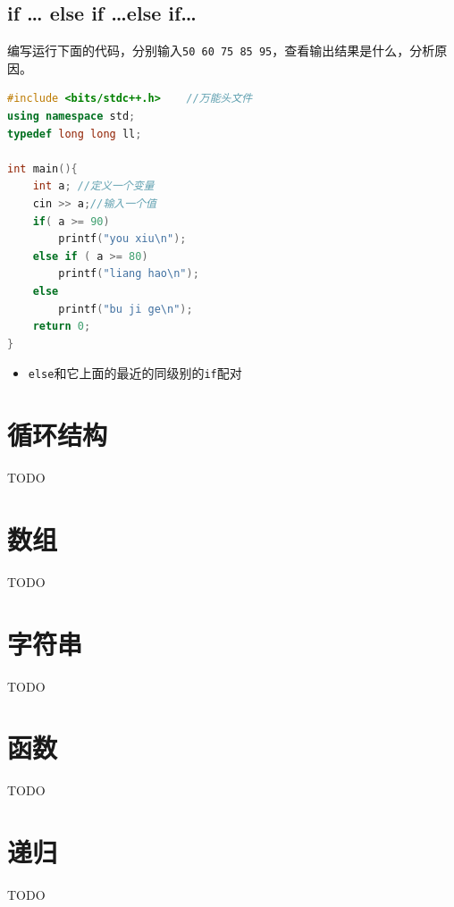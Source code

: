 \documentclass[
  paper=a4,
  ,captions=tableheading
]{scrbook}
\newcommand{\passthrough}[1]{#1}
\providecommand{\tightlist}{%
  \setlength{\itemsep}{0pt}\setlength{\parskip}{0pt}}
\begin{document}
\hypertarget{if-else-if-else-if}{%
\subsection{if \ldots{} else if \ldots else
if\ldots{}}\label{if-else-if-else-if}}

编写运行下面的代码，分别输入\passthrough{\lstinline!50 60 75 85 95!}，查看输出结果是什么，分析原因。

\begin{lstlisting}[language={C++}]
#include <bits/stdc++.h>    //万能头文件
using namespace std;
typedef long long ll;

int main(){
    int a; //定义一个变量
    cin >> a;//输入一个值
    if( a >= 90)
        printf("you xiu\n");
    else if ( a >= 80)
        printf("liang hao\n");
    else 
        printf("bu ji ge\n");
    return 0;
}
\end{lstlisting}

\begin{itemize}
\tightlist
\item
  \passthrough{\lstinline!else!}和它上面的最近的同级别的\passthrough{\lstinline!if!}配对
\end{itemize}

\hypertarget{ux5faaux73afux7ed3ux6784}{%
\section{循环结构}\label{ux5faaux73afux7ed3ux6784}}

TODO

\hypertarget{ux6570ux7ec4}{%
\section{数组}\label{ux6570ux7ec4}}

TODO

\hypertarget{ux5b57ux7b26ux4e32}{%
\section{字符串}\label{ux5b57ux7b26ux4e32}}

TODO

\hypertarget{ux51fdux6570}{%
\section{函数}\label{ux51fdux6570}}

TODO

\hypertarget{ux9012ux5f52}{%
\section{递归}\label{ux9012ux5f52}}

TODO
\end{document}
